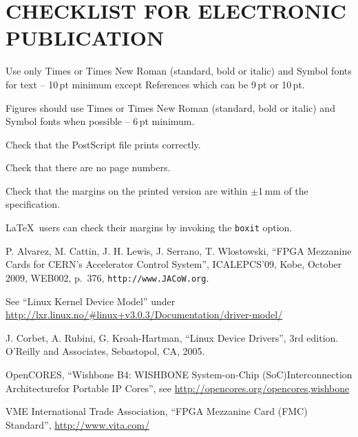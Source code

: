 \documentclass{JAC2003}
\begin{document}
\section{CHECKLIST FOR ELECTRONIC PUBLICATION}

\begin{Itemize}
    \item  Use only Times or Times New Roman (standard, bold or italic) and Symbol 
    			fonts for text -- 10\,pt minimum except References which can be 9\,pt or 10\,pt.
    \item  Figures should use Times or Times New Roman (standard, bold or italic) and Symbol fonts when possible
            -- 6\,pt minimum.
    \item  Check that the PostScript file prints correctly.
    \item  Check that there are no page numbers.
    \item  Check that the margins on the printed version are within $\pm$1\,mm of the specification.
    \item  \LaTeX\ users can check their margins by invoking the
           \texttt{boxit} option.
\end{Itemize}

\begin{thebibliography}{9}   %

P. Alvarez, M. Cattin, J. H. Lewis, J. Serrano, T. Wlostowski,
``FPGA Mezzanine Cards for CERN’s Accelerator Control System'',
ICALEPCS'09, Kobe, October 2009, WEB002, p.~376,
\texttt{http://www.JACoW.org}.

See ``Linux Kernel Device Model''
under \url{http://lxr.linux.no/#linux+v3.0.3/Documentation/driver-model/}

J. Corbet, A. Rubini, G. Kroah-Hartman, ``Linux Device Drivers'', 3rd
edition. O'Reilly and Associates, Sebastopol, CA, 2005.

OpenCORES,
``Wishbone B4: WISHBONE System-on-Chip (SoC)Interconnection
Architecturefor Portable IP Cores'',
see \url{http://opencores.org/opencores,wishbone}

VME International Trade Association,
``FPGA Mezzanine Card (FMC) Standard'', \url{http://www.vita.com/}

\end{thebibliography}
\end{document}
